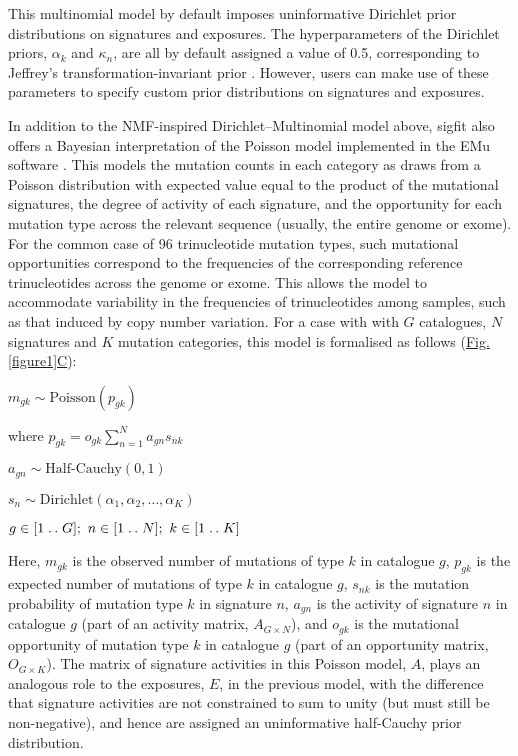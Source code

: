  This multinomial model by default imposes uninformative Dirichlet prior distributions on signatures and exposures. The hyperparameters of the Dirichlet priors, $\alpha_k$ and $\kappa_n$, are all by default assigned a value of 0.5, corresponding to Jeffrey's transformation-invariant prior \cite{Jeffreys1946}. However, users can make use of these parameters to specify custom prior distributions on signatures and exposures.

In addition to the NMF-inspired Dirichlet–Multinomial model above, sigfit also offers a Bayesian interpretation of the Poisson model implemented in the EMu software \citep{Fischer2013}. This models the mutation counts in each category as draws from a Poisson distribution with expected value equal to the product of the mutational signatures, the degree of activity of each signature, and the opportunity for each mutation type across the relevant sequence (usually, the entire genome or exome). For the common case of 96 trinucleotide mutation types, such mutational opportunities correspond to the frequencies of the corresponding reference trinucleotides across the genome or exome. This allows the model to accommodate variability in the frequencies of trinucleotides among samples, such as that induced by copy number variation. For a case with with $G$ catalogues, $N$ signatures and $K$ mutation categories, this model is formalised as follows (\hyperref[figure1]{Fig. \ref*{figure1}C}):

\begin{center}
\onehalfspacing

$m_{gk} \sim \text{Poisson}(p_{gk})$

where $p_{gk} = o_{gk} \sum_{n=1}^N a_{gn} s_{nk}$

$a_{gn} \sim \text{Half-Cauchy}(0, 1)$

$s_n \sim \text{Dirichlet}(\alpha_1, \alpha_2, \dots, \alpha_K) $

$g \in [1 \mathrel{{.}\,{.}}\nobreak G];\ n \in [1 \mathrel{{.}\,{.}}\nobreak N];\ k \in [1 \mathrel{{.}\,{.}}\nobreak K]$

\end{center}

Here, $m_{gk}$ is the observed number of mutations of type $k$ in catalogue $g$, $p_{gk}$ is the expected number of mutations of type $k$ in catalogue $g$, $s_{nk}$ is the mutation probability of mutation type $k$ in signature $n$, $a_{gn}$ is the activity of signature $n$ in catalogue $g$ (part of an activity matrix, $A_{G \times N}$), and $o_{gk}$ is the mutational opportunity of mutation type $k$ in catalogue $g$ (part of an opportunity matrix, $O_{G \times K}$). The matrix of signature activities in this Poisson model, $A$, plays an analogous role to the exposures, $E$, in the previous model, with the difference that signature activities are not constrained to sum to unity (but must still be non-negative), and hence are assigned an uninformative half-Cauchy prior distribution.

